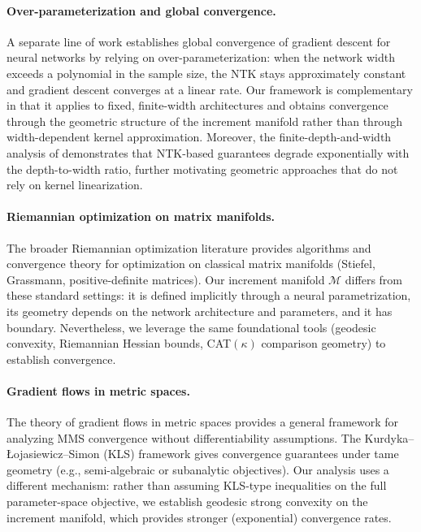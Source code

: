 \documentclass[twoside,11pt]{article}
\newcommand{\rev}[1]{#1}                           %
\newcommand{\calM}{\mathcal{M}}
\begin{document}
\rev{%
\paragraph{Over-parameterization and global convergence.}
A separate line of work establishes global convergence of gradient descent for neural networks
by relying on over-parameterization: when the network width exceeds a polynomial in the sample
size, the NTK stays approximately constant and gradient descent converges at a linear rate.
Our framework is complementary in that it applies to fixed, finite-width architectures
and obtains convergence through the geometric structure of the increment manifold rather than
through width-dependent kernel approximation.
Moreover, the finite-depth-and-width analysis of \citet{hanin2019finite} demonstrates that NTK-based guarantees degrade exponentially with the depth-to-width ratio, further motivating geometric approaches that do not rely on kernel linearization.

\paragraph{Riemannian optimization on matrix manifolds.}
The broader Riemannian optimization literature \citep{absil2008optimization,boumal2023intromanifolds}
provides algorithms and convergence theory for optimization on classical matrix manifolds
(Stiefel, Grassmann, positive-definite matrices).
Our increment manifold $\calM$ differs from these standard settings:
it is defined implicitly through a neural parametrization, its geometry depends on the
network architecture and parameters, and it has boundary.
Nevertheless, we leverage the same foundational tools (geodesic convexity, Riemannian Hessian bounds,
CAT$(\kappa)$ comparison geometry) to establish convergence.

\paragraph{Gradient flows in metric spaces.}
The theory of gradient flows in metric spaces \citep{ambrosio2005gradient} provides a
general framework for analyzing MMS convergence without differentiability assumptions.
The Kurdyka--\L{}ojasiewicz--Simon (KLS) framework \citep{hauer2019kurdyka,attouch2013convergence}
gives convergence guarantees under tame geometry (e.g., semi-algebraic or subanalytic objectives).
Our analysis uses a different mechanism: rather than assuming KLS-type inequalities on the full
parameter-space objective, we establish geodesic strong convexity on the increment manifold,
which provides stronger (exponential) convergence rates.
}
\fi
\end{document}
